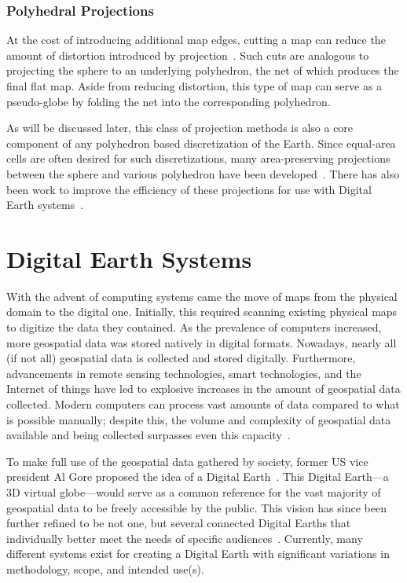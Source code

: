 \subsubsection{Polyhedral Projections}
At the cost of introducing additional map edges, cutting a map can reduce the amount of distortion introduced by projection~\cite{soliman2018optimal}.
Such cuts are analogous to projecting the sphere to an underlying polyhedron, the net of which produces the final flat map.
Aside from reducing distortion, this type of map can serve as a pseudo-globe by folding the net into the corresponding polyhedron.


As will be discussed later, this class of projection methods is also a core component of any polyhedron based discretization of the Earth.
Since equal-area cells are often desired for such discretizations, many area-preserving projections between the sphere and various polyhedron have been developed~\cite{bradley1946equal, snyder1992equal, van2006slice, rocsca2011uniform, rocsca2012area, holhocs2014octahedral}.
There has also been work to improve the efficiency of these projections for use with Digital Earth systems~\cite{harrison2011optimization}.


\section{Digital Earth Systems}
With the advent of computing systems came the move of maps from the physical domain to the digital one.
Initially, this required scanning existing physical maps to digitize the data they contained.
As the prevalence of computers increased, more geospatial data was stored natively in digital formats.
Nowadays, nearly all (if not all) geospatial data is collected and stored digitally.
Furthermore, advancements in remote sensing technologies, smart technologies, and the Internet of things have led to explosive increases in the amount of geospatial data collected.
Modern computers can process vast amounts of data compared to what is possible manually; despite this, the volume and complexity of geospatial data available and being collected surpasses even this capacity~\cite{lee2015geospatial}.


To make full use of the geospatial data gathered by society, former US vice president Al Gore proposed the idea of a Digital Earth~\cite{gore1998}.
This Digital Earth---a 3D virtual globe---would serve as a common reference for the vast majority of geospatial data to be freely accessible by the public.
This vision has since been further refined to be not one, but several connected Digital Earths that individually better meet the needs of specific audiences~\cite{goodchild2012next}.
Currently, many different systems exist for creating a Digital Earth with significant variations in methodology, scope, and intended use(s).



